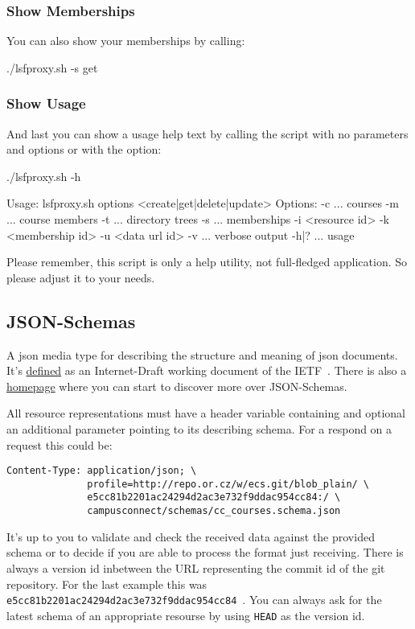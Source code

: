 \subsubsection{Show Memberships}
You can also show your memberships by calling:
\begin{code}
  ./lsfproxy.sh -s get
\end{code}

\subsubsection{Show Usage}
And last you can show a usage help text by calling the script with no
parameters and options or with the  option:
\begin{code}
  ./lsfproxy.sh -h

  Usage: lsfproxy.sh options <create|get|delete|update>
  Options:
    -c ... courses
    -m ... course members
    -t ... directory trees
    -s ... memberships
    -i <resource id>
    -k <membership id>
    -u <data url id>
    -v   ... verbose output
    -h|? ... usage
\end{code}
Please remember, this script is only a help utility, not full-fledged
application. So please adjust it to your needs. 

\hypertarget{campusconnect\_json\_schemas}{}
\subsection{JSON-Schemas}
A json media type for describing the structure and meaning of json documents.
It's \href{http://tools.ietf.org/html/draft-zyp-json-schema-03}{defined} as an
Internet-Draft working document of the IETF~. There is also a \href{http://json-schema.org}{homepage} where you can
start to discover more over JSON-Schemas.

All resource representations must have a  header variable
containing and optional an additional parameter  pointing to its
describing schema. For a respond on a  request this
could be:
\begin{verbatim}
Content-Type: application/json; \
              profile=http://repo.or.cz/w/ecs.git/blob_plain/ \
              e5cc81b2201ac24294d2ac3e732f9ddac954cc84:/ \
              campusconnect/schemas/cc_courses.schema.json
\end{verbatim}
It's up to you to validate and check the received data against the provided
schema or to decide if you are able to process the format just receiving. There
is always a version id inbetween the  URL representing the commit
id of the git repository. For the last \hv{Content-Type} example this was
\verb!e5cc81b2201ac24294d2ac3e732f9ddac954cc84!~. You can always ask for the
latest schema of an appropriate resourse by using \verb!HEAD! as the version
id.

